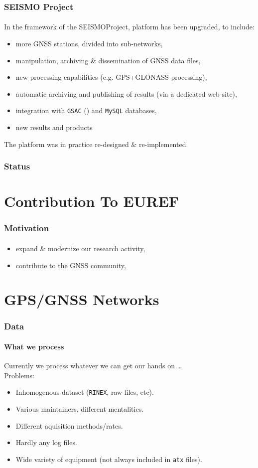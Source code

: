 \documentclass{beamer}
\begin{document}
\begin{frame}\frametitle{SEISMO Project}\framesubtitle{}
  In the framework of the SEISMO\footnotemark Project, platform has been upgraded,
  to include:

  \begin{itemize}
    \item more GNSS stations, divided into sub-networks,
    \item manipulation, archiving \& dissemination of GNSS data files,
    \item new processing capabilities (e.g. GPS+GLONASS processing),
    \item automatic archiving and publishing of results (via a dedicated web-site),
    \item integration with \texttt{GSAC} (\cite{gsac}) and \texttt{MySQL} databases,
    \item new results and products
  \end{itemize}

  The platform was in practice re-designed \& re-implemented.

\end{frame}

\begin{frame}\frametitle{Status}\framesubtitle{}
\end{frame}

\section{Contribution To EUREF}

\begin{frame}\frametitle{Motivation}\framesubtitle{}
  \begin{itemize}
    \item expand \& modernize our research activity,
    \item contribute to the GNSS community,
  \end{itemize}
\end{frame}

\section{GPS/GNSS Networks}

\begin{frame}\frametitle{Data}\framesubtitle{What we process}
  Currently we process whatever we can get our hands on \ldots\\
  Problems:
  \begin{itemize}
    \item Inhomogenous dataset (\texttt{RINEX}, raw files, etc).
    \item Various maintainers, different mentalities.
    \item Different aquisition methods/rates.
    \item Hardly any log files.
    \item Wide variety of equipment (not always included in \texttt{atx} files).
  \end{itemize}
\end{frame}
\end{document}

